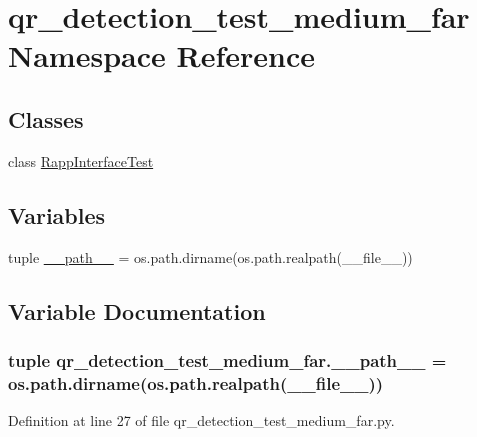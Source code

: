 \hypertarget{namespaceqr__detection__test__medium__far}{\section{qr\-\_\-detection\-\_\-test\-\_\-medium\-\_\-far Namespace Reference}
\label{namespaceqr__detection__test__medium__far}
}
\subsection*{Classes}
\begin{DoxyCompactItemize}
\item 
class \hyperlink{classqr__detection__test__medium__far_1_1RappInterfaceTest}{Rapp\-Interface\-Test}
\end{DoxyCompactItemize}
\subsection*{Variables}
\begin{DoxyCompactItemize}
\item 
tuple \hyperlink{namespaceqr__detection__test__medium__far_ae939b133fa595da57b60a30e68207aa7}{\-\_\-\-\_\-path\-\_\-\-\_\-} = os.\-path.\-dirname(os.\-path.\-realpath(\-\_\-\-\_\-file\-\_\-\-\_\-))
\end{DoxyCompactItemize}


\subsection{Variable Documentation}
\hypertarget{namespaceqr__detection__test__medium__far_ae939b133fa595da57b60a30e68207aa7}{
\subsubsection[{\-\_\-\-\_\-path\-\_\-\-\_\-}]{\setlength{\rightskip}{0pt plus 5cm}tuple qr\-\_\-detection\-\_\-test\-\_\-medium\-\_\-far.\-\_\-\-\_\-path\-\_\-\-\_\- = os.\-path.\-dirname(os.\-path.\-realpath(\-\_\-\-\_\-file\-\_\-\-\_\-))}}\label{namespaceqr__detection__test__medium__far_ae939b133fa595da57b60a30e68207aa7}


Definition at line 27 of file qr\-\_\-detection\-\_\-test\-\_\-medium\-\_\-far.\-py.


